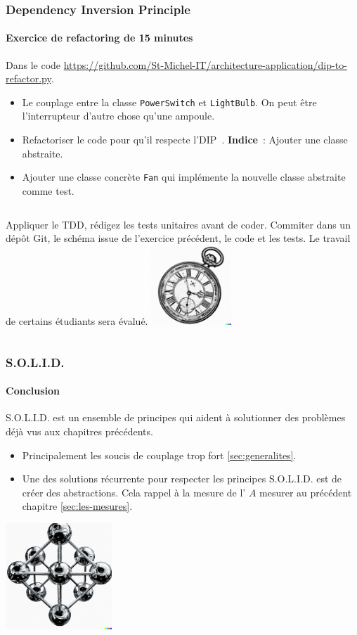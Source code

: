 \documentclass{beamer}
\begin{document}
    \begin{frame}
        \transdissolve
        \frametitle{Dependency Inversion Principle}
        \framesubtitle{Exercice \execcounterdispinc{} de refactoring de 15 minutes}
        Dans le code \url{https://github.com/St-Michel-IT/architecture-application/dip-to-refactor.py}.
        \begin{itemize}
            \item Le couplage entre la classe \lstinline{PowerSwitch} et \lstinline{LightBulb}.
            On peut être l'interrupteur d'autre chose qu'une ampoule.
            \item Refactoriser le code pour qu'il respecte l'DIP~. \textbf{Indice}~: Ajouter une classe abstraite.
            \item Ajouter une classe concrète \lstinline{Fan} qui implémente la nouvelle classe abstraite comme test.
        \end{itemize}
        \bigbreak
        \begin{columns}
            Appliquer le TDD, rédigez les tests unitaires avant de coder.
            \bigbreak
            Commiter dans un dépôt Git, le schéma issue de l'exercice précédent, le code et les tests.
            \bigbreak
            Le travail de certains étudiants sera évalué.
            \centering
            \includegraphics[width=3cm]{image/engraving-of-an-old-watch}
        \end{columns}
    \end{frame}

    \begin{frame}
        \transdissolve
        \frametitle{S.O.L.I.D.}
        \framesubtitle{Conclusion}
        S.O.L.I.D. est un ensemble de principes qui aident à solutionner des problèmes déjà vus aux chapitres précédents.
        \begin{itemize}
            \item Principalement les soucis de couplage trop fort \cref{sec:generalites}.
            \item Une des solutions récurrente pour respecter les principes S.O.L.I.D. est de créer des abstractions.
            Cela rappel à la mesure de l' $A$ mesurer au précédent chapitre \cref{sec:les-mesures}.
        \end{itemize}
        \bigbreak
        \centering
        \includegraphics[width=4cm]{image/carbon-atoms}
    \end{frame}
\end{document}
